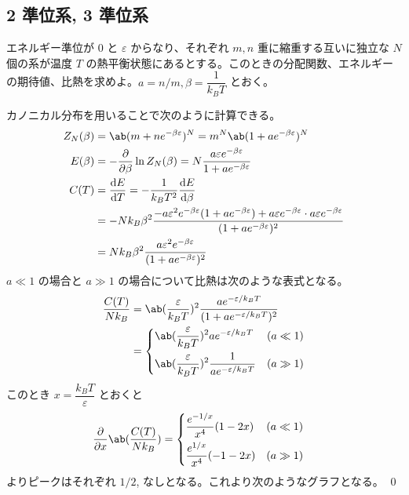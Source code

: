 \documentclass[uplatex,dvipdfmx,a4paper,11pt]{jlreq}
\makeatletter
\numberwithin{equation}{section}
\theoremstyle{definition}
\renewenvironment{proof}[1][\proofname]{\par
  \normalfont
  \topsep6\p@\@plus6\p@ \trivlist
  \item[\hskip\labelsep{\bfseries #1}\@addpunct{\bfseries}]\ignorespaces\quad\par
}{%
  \qed\endtrivlist\@endpefalse
}
\renewcommand\proofname{証明}
\makeatother
\begin{document}
\subsection{2 準位系, 3 準位系}

\begin{problem}
エネルギー準位が $0$ と $\varepsilon$ からなり、それぞれ $m, n$ 重に縮重する互いに独立な $N$ 個の系が温度 $T$ の熱平衡状態にあるとする。このときの分配関数、エネルギーの期待値、比熱を求めよ。$a = n/m, \beta = \dfrac{1}{k_BT}$ とおく。
\end{problem}
\begin{proof}
  カノニカル分布を用いることで次のように計算できる。
  \begin{align}
    Z_N(\beta) & = \ab(m + ne^{-\beta \varepsilon})^N = m^N\ab(1 + ae^{-\beta \varepsilon})^N                                                                                                                         \\
    E(\beta)   & = -\diffp{}{\beta}\ln Z_N(\beta) = N\frac{a\varepsilon e^{-\beta \varepsilon}}{1 + ae^{-\beta \varepsilon}}                                                                                          \\
    C(T)       & = \diff{E}{T} = -\frac{1}{k_BT^2}\diff{E}{\beta}                                                                                                                                                     \\
               & = -Nk_B\beta^2\frac{-a\varepsilon^2 e^{-\beta\varepsilon}(1 + ae^{-\beta \varepsilon}) + a\varepsilon e^{-\beta\varepsilon}\cdot a\varepsilon e^{-\beta\varepsilon}}{(1 + ae^{-\beta\varepsilon})^2} \\
               & = Nk_B\beta^2\frac{a\varepsilon^2 e^{-\beta\varepsilon}}{(1 + ae^{-\beta\varepsilon})^2}
  \end{align}
  $a \ll 1$ の場合と $a \gg 1$ の場合について比熱は次のような表式となる。
  \begin{align}
    \frac{C(T)}{Nk_B} & = \ab(\frac{\varepsilon}{k_BT})^2\frac{ae^{-\varepsilon/k_BT}}{(1 + ae^{-\varepsilon/k_BT})^2} \\
                      & = \begin{dcases}
                            \ab(\frac{\varepsilon}{k_BT})^2 ae^{-\varepsilon/k_BT}          & (a \ll 1) \\
                            \ab(\frac{\varepsilon}{k_BT})^2\frac{1}{ae^{-\varepsilon/k_BT}} & (a \gg 1)
                          \end{dcases}
  \end{align}
  このとき $x = \dfrac{k_BT}{\varepsilon}$ とおくと
  \begin{align}
    \diffp{}{x}\ab(\frac{C(T)}{Nk_B}) & =
    \begin{dcases}
      \frac{e^{-1/x}}{x^4}(1 - 2x) & (a\ll 1) \\
      \frac{e^{1/x}}{x^4}(-1 - 2x) & (a\gg 1)
    \end{dcases}
  \end{align}
  よりピークはそれぞれ $1/2$, なしとなる。これより次のようなグラフとなる。
\end{proof}
\clearpage
\end{document}
